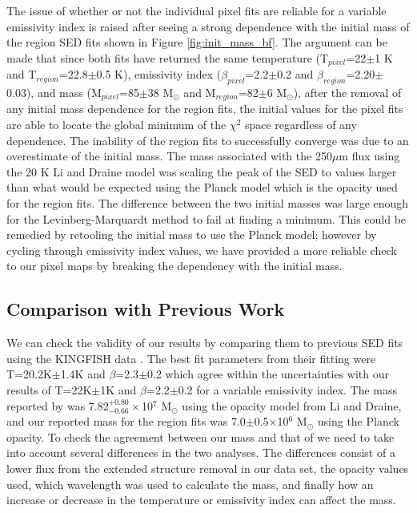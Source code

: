 The issue of whether or not the individual pixel fits are reliable for a variable emissivity index is raised after seeing a strong dependence with the initial mass of the region SED fits shown in Figure \ref{fig:init_mass_bf}.  The argument can be made that since both fits have returned the same temperature (T$_{pixel}$=22$\pm$1 K and T$_{region}$=22.8$\pm$0.5 K), emissivity index ($\beta_{pixel}$=2.2$\pm$0.2 and $\beta_{region}$=2.20$\pm$0.03), and mass (M$_{pixel}$=85$\pm$38 M$_\odot$ and M$_{region}$=82$\pm$6 M$_\odot$), after the removal of any initial mass dependence for the region fits, the initial values for the pixel fits are able to locate the global minimum of the $\chi^2$ space regardless of any dependence.  The inability of the region fits to successfully converge was due to an overestimate of the initial mass.  The mass associated with the 250$\mu$m flux using the 20 K Li and Draine model was scaling the peak of the SED to values larger than what would be expected using the Planck model which is the opacity used for the region fits.  The difference between the two initial masses was large enough for the Levinberg-Marquardt method to fail at finding a minimum.  This could be remedied by retooling the initial mass to use the Planck model; however by cycling through emissivity index values, we have provided a more reliable check to our pixel maps by breaking the dependency with the initial mass.

\subsection{Comparison with Previous Work}

We can check the validity of our results by comparing them to previous SED fits using the KINGFISH data \citep{galametz2012}.  The best fit parameters from their fitting were T=20.2K$\pm$1.4K and $\beta$=2.3$\pm$0.2 which agree within the uncertainties with our results of T=22K$\pm$1K and $\beta$=2.2$\pm$0.2 for a variable emissivity index.  The mass reported by \cite{galametz2012} was 7.82$^{+0.80}_{-0.66}\times$10$^7$ M$_\odot$ using the opacity model from Li and Draine, and our reported mass for the region fits was 7.0$\pm$0.5$\times$10$^6$ M$_\odot$ using the Planck opacity.  To check the agreement between our mass and that of \cite{galametz2012} we need to take into account several differences in the two analyses. The differences consist of a lower flux from the extended structure removal in our data set, the opacity values used, which wavelength was used to calculate the mass, and finally how an increase or decrease in the temperature or emissivity index can affect the mass.  

